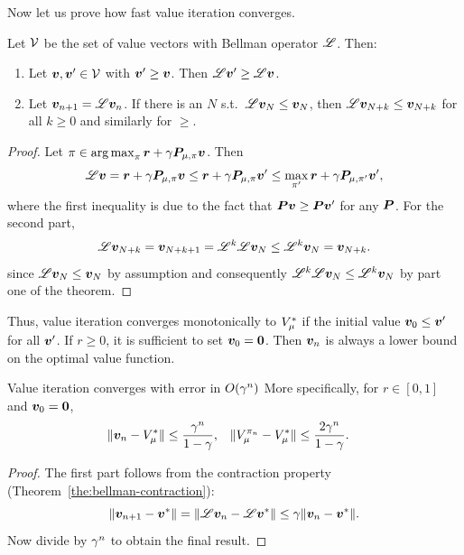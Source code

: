 Now let us prove how fast value iteration converges.
  \begin{theorem}
    Let $\mathcal{V}$ be the set of value vectors with Bellman operator $\mathscr{L}$. Then:
    \begin{enumerate}
    \item Let $\val, \val' \in \Vals$ with $\val' \geq \val$. Then $\blm
      \val' \geq \blm \val$.
    \item Let $\val_{n+1} = \blm \val_n$. If there is an $N$ s.t.\ $\blm
      \val_N \leq \val_N$, then $\blm \val_{N+k} \leq \val_{N+k}$ for
      all $k \geq 0$ and similarly for $\geq$.
    \end{enumerate}
    \label{the:value-iteration-monotonicity}
  \end{theorem}
  \begin{proof}
    Let $\pol \in \argmax_\pol \vreward + \disc \trans_{\mdp,\pol} \val$. Then
    \[
    \blm \val
    = \vreward + \disc \trans_{\mdp,\pol} \val
    \leq \vreward + \disc \trans_{\mdp,\pol} \val'
    \leq \max_{\pol'}\vreward + \disc \trans_{\mdp,\pol'} \val',
    \]
    where the first inequality is due to the fact that $\trans \val \geq \trans \val'$ for any $\trans$.
    For the second part, 
    \[
    \blm \val_{N+k} = \val_{N+k+1} = \blm^k \blm \val_N \leq \blm^k \val_N = \val_{N+k}.
    \]
    since $\blm \val_N \leq \val_N$ by assumption and consequently $\blm^k \blm \val_N \leq \blm^k \val_N$ by part one of the theorem.
  \end{proof}

  Thus, value iteration converges monotonically to $V^*_{\mu}$ if the
  initial value $\val_0 \leq \val'$ for all $\val'$.  If $r \geq 0$,
  it is sufficient to set $\val_0 = \mathbf{0}$. Then $\val_n$ is always
  a lower bound on the optimal value function.
\begin{theorem}
  Value iteration converges with error in $O(\gamma^n)$
  More specifically, for $r \in [0,1]$ and $\val_0 = \mathbf{0}$, 
  \begin{align*}
    \|\val_n - V_\mdp^*\| &\leq \frac{\disc^n}{1 - \disc},
    &
    \|V^{\pol_n}_\mdp - V_\mdp^*\| &\leq \frac{2\disc^n}{1 - \disc}.
  \end{align*}
\end{theorem}
\begin{proof}
  The first part follows from the contraction property (Theorem~\ref{the:bellman-contraction}):
  \begin{equation}
    \|\val_{n+1} - \val^*\|
    =
    \|\blm \val_{n} - \blm \val^*\|
    \leq 
    \disc \|\val_{n} - \val^*\|.  %
  \end{equation}
  Now divide by $\gamma^n$ to obtain the final result.
  
\end{proof}

